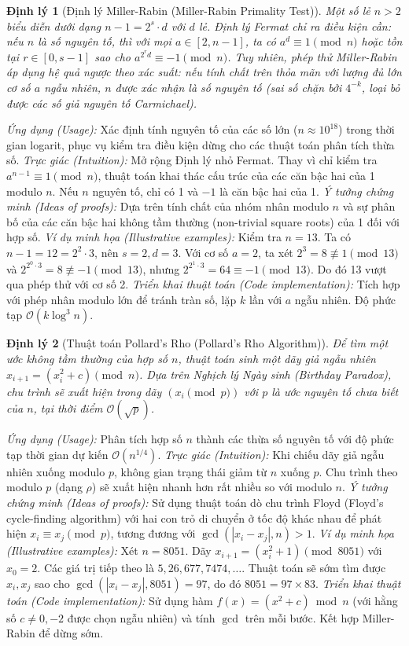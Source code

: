 \documentclass{article}
\newtheorem{dinhly}{Định lý}
\begin{document}
\begin{dinhly}[Định lý Miller-Rabin (Miller-Rabin Primality Test)]
    Một số lẻ $n > 2$ biểu diễn dưới dạng $n - 1 = 2^s \cdot d$ với $d$ lẻ. Định lý Fermat chỉ ra điều kiện cần: nếu $n$ là số nguyên tố, thì với mọi $a \in [2, n-1]$, ta có $a^d \equiv 1 \pmod{n}$ hoặc tồn tại $r \in [0, s-1]$ sao cho $a^{2^r d} \equiv -1 \pmod{n}$. Tuy nhiên, phép thử Miller-Rabin áp dụng hệ quả ngược theo xác suất: nếu tính chất trên thỏa mãn với lượng đủ lớn cơ số $a$ ngẫu nhiên, $n$ được xác nhận là số nguyên tố (sai số chặn bởi $4^{-k}$, loại bỏ được các số giả nguyên tố Carmichael).
\end{dinhly}
\emph{Ứng dụng (Usage):} Xác định tính nguyên tố của các số lớn ($n \approx 10^{18}$) trong thời gian logarit, phục vụ kiểm tra điều kiện dừng cho các thuật toán phân tích thừa số.
\emph{Trực giác (Intuition):} Mở rộng Định lý nhỏ Fermat. Thay vì chỉ kiểm tra $a^{n-1} \equiv 1 \pmod{n}$, thuật toán khai thác cấu trúc của các căn bậc hai của 1 modulo $n$. Nếu $n$ nguyên tố, chỉ có 1 và $-1$ là căn bậc hai của 1.
\emph{Ý tưởng chứng minh (Ideas of proofs):} Dựa trên tính chất của nhóm nhân modulo $n$ và sự phân bố của các căn bậc hai không tầm thường (non-trivial square roots) của 1 đối với hợp số.
\emph{Ví dụ minh họa (Illustrative examples):} Kiểm tra $n=13$. Ta có $n-1 = 12 = 2^2 \cdot 3$, nên $s=2, d=3$. Với cơ số $a=2$, ta xét $2^3 = 8 \not\equiv 1 \pmod{13}$ và $2^{2^0 \cdot 3} = 8 \not\equiv -1 \pmod{13}$, nhưng $2^{2^1 \cdot 3} = 64 \equiv -1 \pmod{13}$. Do đó 13 vượt qua phép thử với cơ số 2.
\emph{Triển khai thuật toán (Code implementation):} Tích hợp với phép nhân modulo lớn để tránh tràn số, lặp $k$ lần với $a$ ngẫu nhiên. Độ phức tạp $\mathcal{O}(k \log^3 n)$.

\begin{dinhly}[Thuật toán Pollard's Rho (Pollard's Rho Algorithm)]
    Để tìm một ước không tầm thường của hợp số $n$, thuật toán sinh một dãy giả ngẫu nhiên $x_{i+1} = (x_i^2 + c) \pmod{n}$. Dựa trên Nghịch lý Ngày sinh (Birthday Paradox), chu trình sẽ xuất hiện trong dãy $(x_i \pmod{p})$ với $p$ là ước nguyên tố chưa biết của $n$, tại thời điểm $\mathcal{O}(\sqrt{p})$.
\end{dinhly}
\emph{Ứng dụng (Usage):} Phân tích hợp số $n$ thành các thừa số nguyên tố với độ phức tạp thời gian dự kiến $\mathcal{O}(n^{1/4})$.
\emph{Trực giác (Intuition):} Khi chiếu dãy giả ngẫu nhiên xuống modulo $p$, không gian trạng thái giảm từ $n$ xuống $p$. Chu trình theo modulo $p$ (dạng $\rho$) sẽ xuất hiện nhanh hơn rất nhiều so với modulo $n$.
\emph{Ý tưởng chứng minh (Ideas of proofs):} Sử dụng thuật toán dò chu trình Floyd (Floyd's cycle-finding algorithm) với hai con trỏ di chuyển ở tốc độ khác nhau để phát hiện $x_i \equiv x_j \pmod{p}$, tương đương với $\gcd(|x_i - x_j|, n) > 1$.
\emph{Ví dụ minh họa (Illustrative examples):} Xét $n = 8051$. Dãy $x_{i+1} = (x_i^2 + 1) \pmod{8051}$ với $x_0 = 2$. Các giá trị tiếp theo là $5, 26, 677, 7474, \dots$. Thuật toán sẽ sớm tìm được $x_i, x_j$ sao cho $\gcd(|x_i - x_j|, 8051) = 97$, do đó $8051 = 97 \times 83$.
\emph{Triển khai thuật toán (Code implementation):} Sử dụng hàm $f(x) = (x^2 + c) \bmod n$ (với hằng số $c \neq 0, -2$ được chọn ngẫu nhiên) và tính $\gcd$ trên mỗi bước. Kết hợp Miller-Rabin để dừng sớm.
\end{document}
